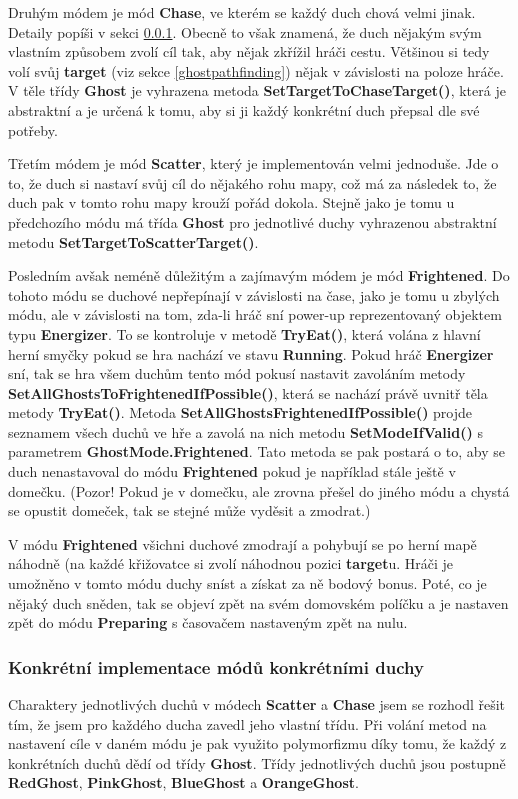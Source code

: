 \documentclass[a4]{article}
\begin{document}
Druhým módem je mód \textbf{Chase}, ve kterém se každý duch chová velmi jinak. Detaily popíši v sekci \ref{concretemodes}. Obecně to však znamená, že duch nějakým svým vlastním způsobem zvolí cíl tak, aby nějak zkřížil hráči cestu. Většinou si tedy volí svůj \textbf{target} (viz sekce \ref{ghostpathfinding}) nějak v závislosti na poloze hráče. V těle třídy \textbf{Ghost} je vyhrazena metoda \textbf{SetTargetToChaseTarget()}, která je abstraktní a je určená k tomu, aby si ji každý konkrétní duch přepsal dle své potřeby.

Třetím módem je mód \textbf{Scatter}, který je implementován velmi jednoduše. Jde o to, že duch si nastaví svůj cíl do nějakého rohu mapy, což má za následek to, že duch pak v tomto rohu mapy krouží pořád dokola. Stejně jako je tomu u předchozího módu má třída \textbf{Ghost} pro jednotlivé duchy vyhrazenou abstraktní metodu \textbf{SetTargetToScatterTarget()}.

Posledním avšak neméně důležitým a zajímavým módem je mód \textbf{Frightened}. Do tohoto módu se duchové nepřepínají v závislosti na čase, jako je tomu u zbylých módu, ale v závislosti na tom, zda-li hráč sní power-up reprezentovaný objektem typu \textbf{Energizer}. To se kontroluje v metodě \textbf{TryEat()}, která volána z hlavní herní smyčky pokud se hra nachází ve stavu \textbf{Running}. Pokud hráč \textbf{Energizer} sní, tak se hra všem duchům tento mód pokusí nastavit zavoláním metody \textbf{SetAllGhostsToFrightenedIfPossible()}, která se nachází právě uvnitř těla metody \textbf{TryEat()}. Metoda \textbf{SetAllGhostsFrightenedIfPossible()} projde seznamem všech duchů ve hře a zavolá na nich metodu \textbf{SetModeIfValid()} s parametrem \textbf{GhostMode.Frightened}. Tato metoda se pak postará o to, aby se duch nenastavoval do módu \textbf{Frightened} pokud je například stále ještě v domečku. (Pozor! Pokud je v domečku, ale zrovna přešel do jiného módu a chystá se opustit domeček, tak se stejné může vyděsit a zmodrat.)

V módu \textbf{Frightened} všichni duchové zmodrají a pohybují se po herní mapě náhodně (na každé křižovatce si zvolí náhodnou pozici \textbf{target}u. Hráči je umožněno v tomto módu duchy sníst a získat za ně bodový bonus. Poté, co je nějaký duch sněden, tak se objeví zpět na svém domovském políčku a je nastaven zpět do módu \textbf{Preparing} s časovačem nastaveným zpět na nulu.

\subsubsection{Konkrétní implementace módů konkrétními duchy} \label{concretemodes}
Charaktery jednotlivých duchů v módech \textbf{Scatter} a \textbf{Chase} jsem se rozhodl řešit tím, že jsem pro každého ducha zavedl jeho vlastní třídu. Při volání metod na nastavení cíle v daném módu je pak využito polymorfizmu díky tomu, že každý z konkrétních duchů dědí od třídy \textbf{Ghost}. Třídy jednotlivých duchů jsou postupně \textbf{RedGhost}, \textbf{PinkGhost}, \textbf{BlueGhost} a \textbf{OrangeGhost}. 
\end{document}

